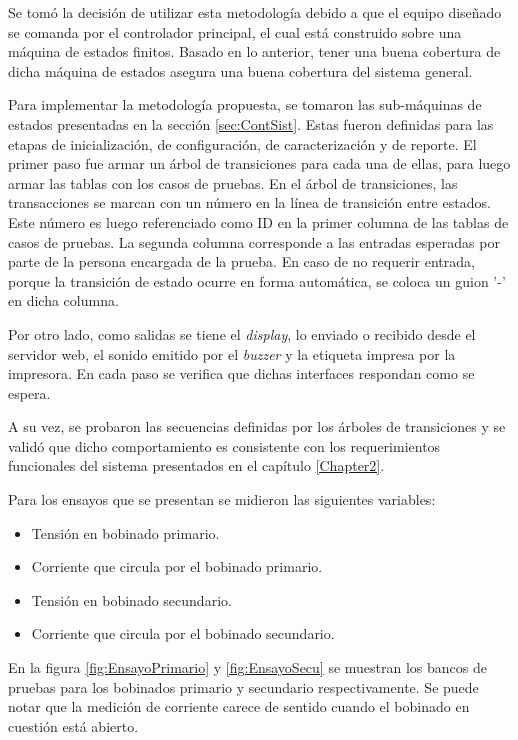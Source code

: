 Se tomó la decisión de utilizar esta metodología debido a que el equipo diseñado se comanda por el controlador principal, el cual está construido sobre una máquina de estados finitos. Basado en lo anterior, tener una buena cobertura de dicha máquina de estados asegura una buena cobertura del sistema general.

Para implementar la metodología propuesta, se tomaron las sub-máquinas de estados presentadas en la sección \ref{sec:ContSist}. Estas fueron definidas para las etapas de inicialización, de configuración, de caracterización y de reporte. El primer paso fue armar un árbol de transiciones para cada una de ellas, para luego armar las tablas con los casos de pruebas. En el árbol de transiciones, las transacciones se marcan con un número en la línea de transición entre estados. Este número es luego referenciado como ID en la primer columna de las tablas de casos de pruebas. La segunda columna corresponde a las entradas esperadas por parte de la persona encargada de la prueba. En caso de no requerir entrada, porque la transición de estado ocurre en forma automática, se coloca un guion '-' en dicha columna. 

Por otro lado, como salidas se tiene el \textit{display}, lo enviado o recibido desde el servidor web, el sonido emitido por el \textit{buzzer} y la etiqueta impresa por la impresora. En cada paso se verifica que dichas interfaces respondan como se espera.

A su vez, se probaron las secuencias definidas por los árboles de transiciones y se validó que dicho comportamiento es consistente con los requerimientos funcionales del sistema presentados en el capítulo \ref{Chapter2}. 

Para los ensayos que se presentan se midieron las siguientes variables:
\begin{itemize}
 	\item Tensión en bobinado primario.
	\item Corriente que circula por el bobinado primario.
	\item Tensión en bobinado secundario.
	\item Corriente que circula por el bobinado secundario.
\end{itemize}

En la figura \ref{fig:EnsayoPrimario} y \ref{fig:EnsayoSecu} se muestran los bancos de pruebas para los bobinados primario y secundario respectivamente. Se puede notar que la medición de corriente carece de sentido cuando el bobinado en cuestión está abierto.

